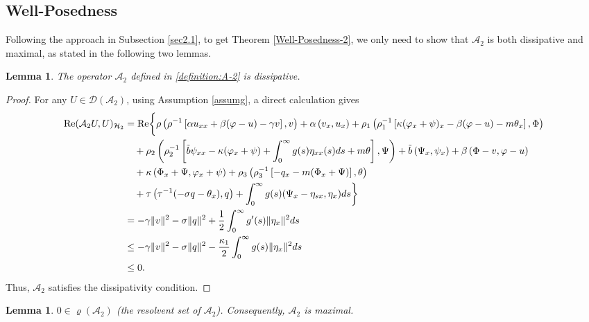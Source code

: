 \documentclass[11pt,reqno]{article}
\newtheorem{lemma}[theorem]{Lemma}
\newcommand{\dt}{\tilde}
\begin{document}
\subsection{Well-Posedness}\label{sec3.1}

Following the approach in Subsection \ref{sec2.1}, to get Theorem \ref{Well-Posedness-2}, we only need to show that $\mathcal{A}_2$ is both dissipative and maximal, as stated in the following two lemmas.
\begin{lemma}\label{dissipative-2}
	The operator $\mathcal{A}_2$ defined in \eqref{definition:A-2} is dissipative.
\end{lemma}
\begin{proof}
	For any $U \in \mathcal{D}(\mathcal{A}_2)$, using Assumption \ref{assumg}, a direct calculation gives
	\begin{align*}
		{\rm Re}(\mathcal{A}_2U,U)_{\mathcal{H}_2} &= {\rm Re}\bigg\{
		\rho\left(\rho^{-1} \left[ \alpha u_{xx} + \beta (\varphi - u) - \gamma v \right], v\right) + \alpha\left(v_x, u_x\right)  + \rho_1\left(\rho_1^{-1} \left[ \kappa (\varphi_x + \psi)_x - \beta (\varphi - u) - m \theta_x \right], \Phi\right) \\
		&\quad + \rho_2\left(\rho_2^{-1} \left[\dt b \psi_{xx} - \kappa (\varphi_x + \psi) + \int_0^\infty g(s) \eta_{xx}(s) ds + m\theta \right], \Psi\right) + \dt b\left(\Psi_x,\psi_x\right) + \beta\left(\Phi - v, \varphi - u\right)  \\
		&\quad + \kappa\left(\Phi_x + \Psi, \varphi_x + \psi\right)  + \rho_3\left(\rho_3^{-1} \left[ -q_x - m (\Phi_x + \Psi) \right], \theta\right)  \\
&\quad +\tau\left(\tau^{-1}(-\sigma q - \theta_x),q\right) + \int_0^\infty g(s)(\Psi_x - \eta_{sx}, \eta_x)  ds \bigg\} \\
		&= -\gamma\|v\|^2  - \sigma \|q\|^2 + \frac{1}{2}\int_{0}^{\infty}g'(s)\|\eta_x\|^2ds\\
		&\le -\gamma\|v\|^2  - \sigma \|q\|^2 - \frac{\kappa_1}{2} \int_0^\infty g(s) \|\eta_x\|^2 ds\\
		&\le 0.
	\end{align*}
	Thus, $\mathcal{A}_2$ satisfies the dissipativity condition.
\end{proof}
\begin{lemma}\label{maximal-2}
	$0 \in \varrho(\mathcal{A}_2)$ (the resolvent set of $\mathcal{A}_2$). Consequently, $\mathcal{A}_2$ is maximal.
\end{lemma}
\end{document}
